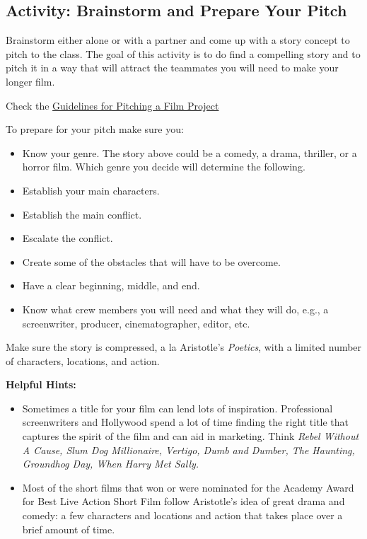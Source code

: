 \documentclass[
]{book}
\providecommand{\tightlist}{%
  \setlength{\itemsep}{0pt}\setlength{\parskip}{0pt}}
\begin{document}
\hypertarget{activity-brainstorm-and-prepare-your-pitch}{%
\subsection*{Activity: Brainstorm and Prepare Your Pitch}\label{activity-brainstorm-and-prepare-your-pitch}}

\begin{reflect}
Brainstorm either alone or with a partner and come up with a story concept to pitch to the class. The goal of this activity is to do find a compelling story and to pitch it in a way that will attract the teammates you will need to make your longer film.

Check the \href{assets/unit8/Guidelines_for_fairytale_template_for_a_short_film.pdf}{Guidelines for Pitching a Film Project}

To prepare for your pitch make sure you:

\begin{itemize}
\tightlist
\item
  Know your genre. The story above could be a comedy, a drama, thriller, or a horror film. Which genre you decide will determine the following.\\
\item
  Establish your main characters.\\
\item
  Establish the main conflict.\\
\item
  Escalate the conflict.\\
\item
  Create some of the obstacles that will have to be overcome.\\
\item
  Have a clear beginning, middle, and end.\\
\item
  Know what crew members you will need and what they will do, e.g., a screenwriter, producer, cinematographer, editor, etc.
\end{itemize}

Make sure the story is compressed, a la Aristotle's \emph{Poetics}, with a limited number of characters, locations, and action.

\textbf{Helpful Hints:}

\begin{itemize}
\tightlist
\item
  Sometimes a title for your film can lend lots of inspiration. Professional screenwriters and Hollywood spend a lot of time finding the right title that captures the spirit of the film and can aid in marketing. Think \emph{Rebel Without A Cause, Slum Dog Millionaire, Vertigo, Dumb and Dumber, The Haunting, Groundhog Day, When Harry Met Sally.}
\item
  Most of the short films that won or were nominated for the Academy Award for Best Live Action Short Film follow Aristotle's idea of great drama and comedy: a few characters and locations and action that takes place over a brief amount of time.
\end{itemize}
\end{reflect}
\end{document}
